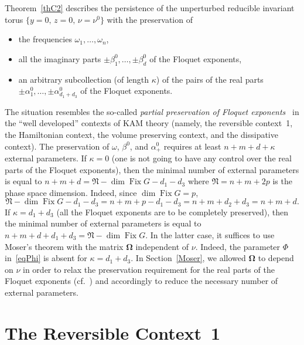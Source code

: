\documentclass[12pt,reqno]{amsart}
\theoremstyle{definition}
\begin{document}
Theorem~\ref{thC2} describes the persistence of the unperturbed reducible
invariant torus $\{y=0, \, z=0, \, \nu=\nu^0\}$ with the preservation of
\begin{itemize}
\item the frequencies $\omega_1,\ldots,\omega_n$,
\item all the imaginary parts $\pm\beta^0_1,\ldots,\pm\beta^0_d$ of the
Floquet exponents,
\item an arbitrary subcollection (of length $\kappa$) of the pairs of the real
parts $\pm\alpha^0_1,\ldots,\pm\alpha^0_{d_1+d_3}$ of the Floquet exponents.
\end{itemize}
The situation resembles the so-called \emph{partial preservation of Floquet
exponents}~\cite{S07Stek} in the ``well developed'' contexts of KAM theory
(namely, the reversible context~1, the Hamiltonian context, the volume
preserving context, and the dissipative context). The preservation of
$\omega$, $\beta^0$, and $\alpha^0_+$ requires at least $n+m+d+\kappa$
external parameters. If $\kappa=0$ (one is not going to have any control over
the real parts of the Floquet exponents), then the minimal number of external
parameters is equal to $n+m+d={\mathfrak N}-\dim\operatorname{Fix} G-d_1-d_3$ where ${\mathfrak N}=n+m+2p$ is
the phase space dimension. Indeed, since $\dim\operatorname{Fix} G=p$,
\[
{\mathfrak N}-\dim\operatorname{Fix} G-d_1-d_3=n+m+p-d_1-d_3=n+m+d_2+d_3=n+m+d.
\]
If $\kappa=d_1+d_3$ (all the Floquet exponents are to be completely
preserved), then the minimal number of external parameters is equal to
$n+m+d+d_1+d_3={\mathfrak N}-\dim\operatorname{Fix} G$. In the latter case, it suffices to use Moser's
theorem with the matrix ${\mathbf{\Omega}}$ independent of $\nu$. Indeed, the parameter
$\Phi$ in~\eqref{eqPhi} is absent for $\kappa=d_1+d_3$. In
Section~\ref{Moser}, we allowed ${\mathbf{\Omega}}$ to depend on $\nu$ in order to relax
the preservation requirement for the real parts of the Floquet exponents
(cf.\ \cite[Section~6d)]{M67}) and accordingly to reduce the necessary number
of external parameters.

\section{The Reversible Context~1}\label{cont1}
\end{document}
